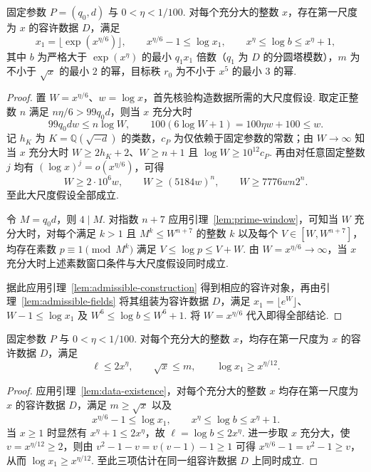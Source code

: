 \begin{lemma}[容许数据的构造与尺度]
\label{lem:data-existence}
\emitthmsource
固定参数 $P=(q_0,d)$ 与 $0<\eta<1/100$. 对每个充分大的整数 $x$，存在第一尺度为 $x$ 的容许数据 $D$，满足
\[
 x_1=\lfloor\exp(x^{\eta/6})\rfloor,\qquad
 x^{\eta/6}-1\le \log x_1,\qquad x^\eta\le\log b\le x^\eta+1,
\]
其中 $b$ 为严格大于 $\exp(x^\eta)$ 的最小 $q_1x_1$ 倍数（$q_1$ 为 $D$ 的分圆塔模数），$m$ 为不小于 $\sqrt{x}$ 的最小 $2$ 的幂，目标秩 $r_0$ 为不小于 $x^5$ 的最小 $3$ 的幂.
\end{lemma}
\begin{proof}
置 $W=x^{\eta/6}$、$w=\log x$，首先核验构造数据所需的大尺度假设. 取定正整数 $n$ 满足 $n\eta/6>99q_0d$，则当 $x$ 充分大时
\[
 99q_0dw\le n\log W,\qquad
 100(6\log W+1)=100\eta w+100\le w.
\]
记 $h_K$ 为 $K=\mathbb Q(\sqrt{-d})$ 的类数，$c_P$ 为仅依赖于固定参数的常数；由 $W\to\infty$ 知当 $x$ 充分大时 $W\ge2h_K+2$、$W\ge n+1$ 且 $\log W\ge10^{12}c_P$. 再由对任意固定整数 $j$ 均有 $(\log x)^j=o(x^{\eta/6})$，可得
\[
 W\ge 2\cdot10^6w,\qquad W\ge(5184w)^n,\qquad
 W\ge7776wn2^n.
\]
至此大尺度假设全部成立.

令 $M=q_0d$，则 $4\mid M$. 对指数 $n+7$ 应用引理~\ref{lem:prime-window}，可知当 $W$ 充分大时，对每个满足 $k>1$ 且 $M^k\le W^{n+7}$ 的整数 $k$ 以及每个 $V\in[W,W^{n+7}]$，均存在素数 $p\equiv1\pmod{M^k}$ 满足 $V\le\log p\le V+W$. 由 $W=x^{\eta/6}\to\infty$，当 $x$ 充分大时上述素数窗口条件与大尺度假设同时成立.

据此应用引理~\ref{lem:admissible-construction} 得到相应的容许对象，再由引理~\ref{lem:admissible-fields} 将其组装为容许数据 $D$，满足 $x_1=\lfloor e^W\rfloor$、$W-1\le\log x_1$ 及 $W^6\le\log b\le W^6+1$. 将 $W=x^{\eta/6}$ 代入即得全部结论.
\end{proof}

\begin{lemma}[容许尺度的存在]
\label{lem:data-scales}
\emitthmsource
固定参数 $P$ 与 $0<\eta<1/100$. 对每个充分大的整数 $x$，均存在第一尺度为 $x$ 的容许数据 $D$，满足
\[
 \ell\le2x^\eta,\qquad \sqrt{x}\le m,\qquad
 \log x_1\ge x^{\eta/12}.
\]
\end{lemma}
\begin{proof}
应用引理~\ref{lem:data-existence}，对每个充分大的整数 $x$ 均存在第一尺度为 $x$ 的容许数据 $D$，满足 $m\ge\sqrt{x}$ 以及
\[
 x^{\eta/6}-1\le \log x_1,\qquad x^\eta\le\log b\le x^\eta+1.
\]
当 $x\ge1$ 时显然有 $x^\eta+1\le2x^\eta$，故 $\ell=\log b\le2x^\eta$. 进一步取 $x$ 充分大，使 $v=x^{\eta/12}\ge2$，则由 $v^2-1-v=v(v-1)-1\ge1$ 可得 $x^{\eta/6}-1=v^2-1\ge v$，从而 $\log x_1\ge x^{\eta/12}$. 至此三项估计在同一组容许数据 $D$ 上同时成立.
\end{proof}

